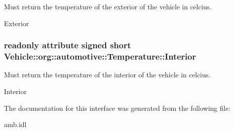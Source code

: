 Must return the temperature of the exterior of the vehicle in celcius. 

Exterior \hypertarget{interfaceVehicle_1_1org_1_1automotive_1_1Temperature_a118e225f0c2d9d1517de9bac54dd685e}{
\subsubsection[{Interior}]{\setlength{\rightskip}{0pt plus 5cm}readonly attribute signed short Vehicle\-::org\-::automotive\-::\-Temperature\-::\-Interior}}\label{interfaceVehicle_1_1org_1_1automotive_1_1Temperature_a118e225f0c2d9d1517de9bac54dd685e}


Must return the temperature of the interior of the vehicle in celcius. 

Interior 

The documentation for this interface was generated from the following file\-:\begin{DoxyCompactItemize}
\item 
amb.\-idl\end{DoxyCompactItemize}

